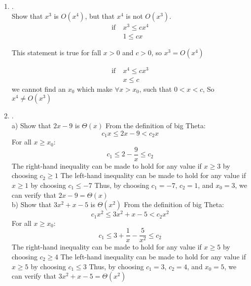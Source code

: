 \documentclass{article}
\theoremstyle{definition}
\theoremstyle{plain}
\providecommand{\ceil}[1]{\left \lceil #1 \right \rceil }
\providecommand{\floor}[1]{\left \lfloor #1 \right \rfloor }
\begin{document}
\begin {enumerate}[itemindent=30pt,label=\bf Exercise {\arabic*}:]
\subitem c) $\floor{\sqrt{\ceil{x}}} = \floor{\sqrt{x}}$, for all real number x.
\subitem let $x= 0.5$, then:
\begin{align*}
	LHS &= \floor{\sqrt{\ceil{x}}} = 1 \\
	RHS &= \floor{\sqrt{x}} = 0 \\
	LHS &\neq RHS \\
	\text{So this}&\text{ statement is false}
\end{align*}
\item .\\
Show that $x^{3}$ is $O(x^{4})$, but that $x^{4}$ is not $O(x^3)$.
\begin{align*}
	\mathrm{if }\;&x^{3} \leqslant c x^{4} \\
				& 1 \leqslant cx
\end{align*}
\begin{center}
This statement is true for fall $x >0$ and  $c>0$, so $x^{3} = O(x^{4})$
\end{center}
\begin{align*}
	\mathrm{if } \;&x^{4} \leqslant c x^{3} \\
				& x \leqslant c
\end{align*}
\subitem \qquad we cannot find an $x_{0}$ which make  $\forall x > x_{0}$, such that $0 < x < c$, So $x^{4} \neq O(x^{3})$
\newpage
\item .\\
\subitem a) Show that $2x - 9$ is $\Theta (x)$
\subitem \qquad From the definition of big Theta:
	$$c_1 x \leq 2x - 9 < c_2 x$$
\subitem \qquad For all $x \geq x_{0}$:
	$$c_1 \leq 2 - \dfrac{9}{x} \leq c_2$$
\subitem \qquad The right-hand inequality can be made to hold for any value if $x \geq 3$ by choosing $c_{2} \geq 1$
\subitem \qquad The left-hand inequality can be made to hold for any value if $x \geq 1$ by choosing $c_{1} \leq -7$
\subitem \qquad Thus, by choosing $c_1 = -7$, $c_2 = 1$, and $x_{0} = 3$, we can verify that $2x - 9 = \Theta (x)$\\
\subitem b) Show that $3x^2 + x - 5$ is $\Theta (x^2)$
\subitem \qquad From the definition of big Theta:
	$$c_1 x^2 \leq 3x^2 + x - 5 < c_2 x^2$$
\subitem \qquad For all $x \geq x_{0}$:
	$$c_1 \leq 3 + \dfrac{1}{x} - \dfrac{5}{x^2} \leq c_2$$
\subitem \qquad The right-hand inequality can be made to hold for any value if $x \geq 5$ by choosing $c_{2} \geq 4$
\subitem \qquad The left-hand inequality can be made to hold for any value if $x \geq 5$ by choosing $c_{1} \leq 3$
\subitem \qquad Thus, by choosing $c_1 = 3$, $c_2 = 4$, and $x_{0} = 5$, we can verify that $3x^2 + x - 5= \Theta (x^2)$\\

\end{enumerate}
\end{document}
